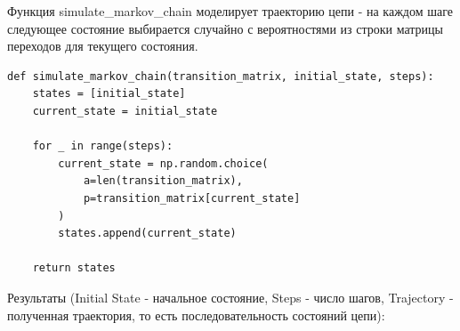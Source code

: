 \documentclass[12pt]{spbstu-task}
\begin{document}
Функция simulate\_markov\_chain моделирует траекторию цепи - на каждом шаге
следующее состояние выбирается случайно с вероятностями из строки матрицы переходов
для текущего состояния.
\begin{lstlisting}[caption={Функция моделирования траектории цепи Маркова}]
def simulate_markov_chain(transition_matrix, initial_state, steps):
    states = [initial_state]
    current_state = initial_state

    for _ in range(steps):
        current_state = np.random.choice(
            a=len(transition_matrix),
            p=transition_matrix[current_state]
        )
        states.append(current_state)

    return states
\end{lstlisting}

Результаты (Initial State - начальное состояние, Steps - число шагов,
Trajectory - полученная траектория, то есть последовательность состояний цепи):
\end{document}
